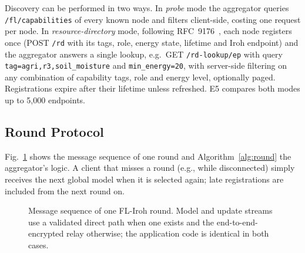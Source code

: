 Discovery can be performed in two ways. In \emph{probe} mode the aggregator queries \texttt{/fl/capabilities} of every known node and filters client-side, costing one request per node. In \emph{resource-directory} mode, following RFC~9176~\cite{rfc9176}, each node registers once (POST \texttt{/rd} with its tags, role, energy state, lifetime and Iroh endpoint) and the aggregator answers a single lookup, e.g.\ GET \texttt{/rd-lookup/ep} with query \texttt{tag=agri,r3,soil\_moisture} and \texttt{min\_energy=20}, with server-side filtering on any combination of capability tags, role and energy level, optionally paged. Registrations expire after their lifetime unless refreshed. E5 compares both modes up to 5{,}000 endpoints.

\subsection{Round Protocol}
\label{sec:round}

Fig.~\ref{fig:sequence} shows the message sequence of one round and Algorithm~\ref{alg:round} the aggregator's logic. A client that misses a round (e.g., while disconnected) simply receives the next global model when it is selected again; late registrations are included from the next round on.

\begin{figure}[t]
\centering
{}
\caption{Message sequence of one FL-Iroh round. Model and update streams use a validated direct path when one exists and the end-to-end-encrypted relay otherwise; the application code is identical in both cases.}
\label{fig:sequence}
\end{figure}

